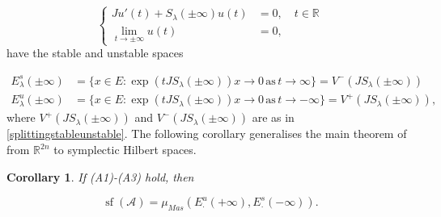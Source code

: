 \documentclass[a4paper,10pt]{article}
\newtheorem*{corA}{Corollary}
\DeclareMathOperator{\sfl}{sf}
\begin{document}
\begin{equation}\label{HamiltonianJacII}
\left\{
\begin{aligned}
Ju'(t)+S_\lambda(\pm\infty)u(t)&=0,\quad t\in\mathbb{R}\\
\lim_{t\rightarrow\pm\infty}u(t)&=0,
\end{aligned}
\right.
\end{equation}
have the stable and unstable spaces

\begin{align*}
E^s_\lambda(\pm\infty)&=\{x\in E: \exp(tJS_\lambda(\pm\infty))x\rightarrow 0\,\text{as}\, t\rightarrow\infty\}=V^-(JS_\lambda(\pm\infty)) \\
E^u_\lambda(\pm\infty)&=\{x\in E: \exp(tJS_\lambda(\pm\infty))x\rightarrow 0\,\text{as}\, t\rightarrow-\infty\}=V^+(JS_\lambda(\pm\infty)),
\end{align*}
where $V^+(JS_\lambda(\pm\infty))$ and $V^-(JS_\lambda(\pm\infty))$ are as in \eqref{splittingstableunstable}. The following corollary generalises the main theorem of \cite{Jacobo} from $\mathbb{R}^{2n}$ to symplectic Hilbert spaces.

\begin{corA}
If (A1)-(A3) hold, then

\[\sfl(\mathcal{A})=\mu_{Mas}(E^u_\cdot(+\infty),E^s_\cdot(-\infty)).\]
\end{corA}
\end{document}

